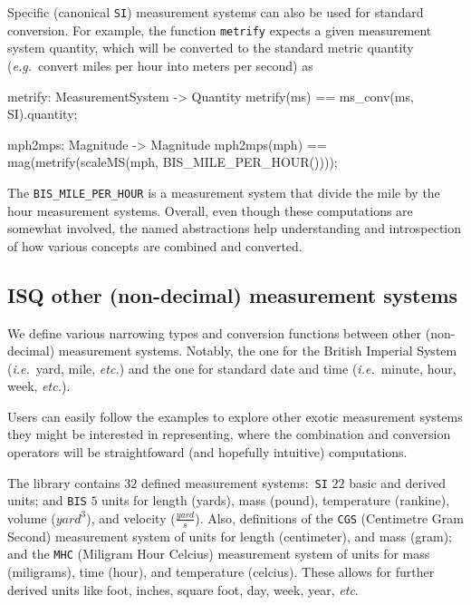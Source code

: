 \documentclass[runningheads,a4paper]{llncs}
\begin{document}
Specific (canonical \texttt{SI}) measurement systems can also be used for standard conversion. For example, the function \texttt{metrify} expects a given measurement system quantity, which will be converted to the standard metric quantity (\textit{e.g.}~convert miles per hour into meters per second) as
%
\begin{vdmsl}[frame=none,basicstyle=\ttfamily\scriptsize]
    metrify: MeasurementSystem -> Quantity
    metrify(ms) == ms_conv(ms, SI).quantity;

    mph2mps: Magnitude -> Magnitude
    mph2mps(mph) ==	mag(metrify(scaleMS(mph, BIS_MILE_PER_HOUR())));
\end{vdmsl}
%
\noindent The \texttt{BIS\_MILE\_PER\_HOUR} is a measurement system that divide the mile by the hour measurement systems. Overall, even though these computations are somewhat involved, the named abstractions help understanding and introspection of how various concepts are combined and converted.  

\subsection*{ISQ other (non-decimal) measurement systems}

We define various narrowing types and conversion functions between other (non-decimal) measurement systems. Notably, the one for the British Imperial System (\textit{i.e.}~yard, mile, \textit{etc.}) and the one for standard date and time (\textit{i.e.}~minute, hour, week, \textit{etc.}). 

Users can easily follow the examples to explore other exotic measurement systems they might be interested in representing, where the combination and conversion operators will be straightfoward (and hopefully intuitive) computations. 

The library contains \(32\) defined measurement systems:~\texttt{SI} \(22\) basic and derived units; and \texttt{BIS} \(5\) units for length (yards), mass (pound), temperature (rankine), volume (\(yard^3\)), and velocity (\(\frac{yard}{s}\)). Also, definitions of the \texttt{CGS} (Centimetre Gram Second) measurement system of units for length (centimeter), and mass (gram); and the \texttt{MHC} (Miligram Hour Celcius) measurement system of units for mass (miligrams), time (hour), and temperature (celcius). These allows for further derived units like foot, inches, square foot, day, week, year, \textit{etc}. 

\end{document}
